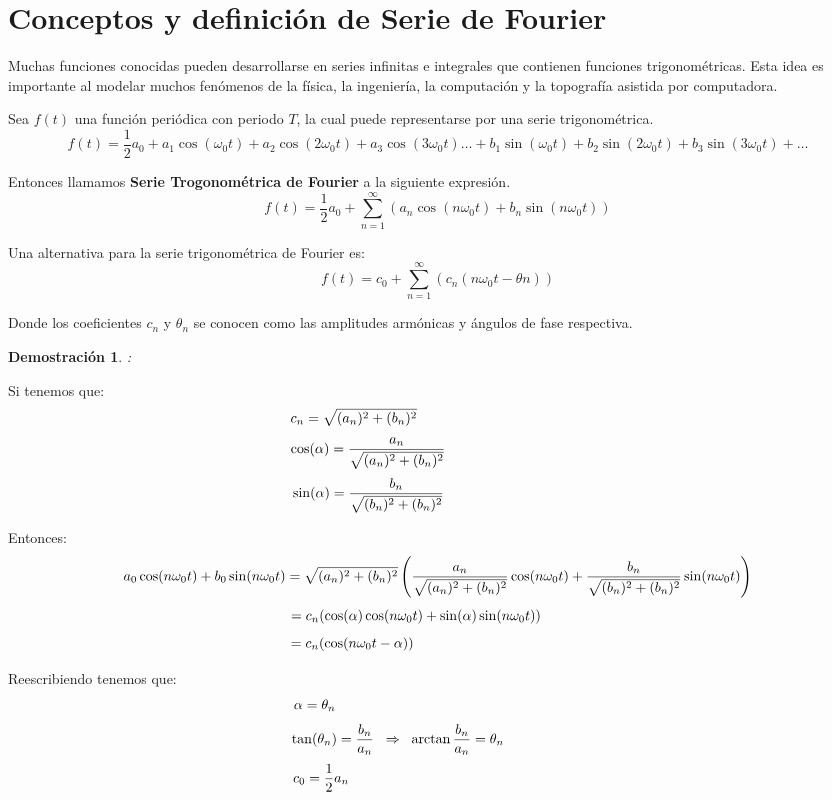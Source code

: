 \documentclass[a4paper]{article}
\newtheorem{dmt}{Demostraci\'on}
\begin{document}
\section{Conceptos y definici\'on de Serie de Fourier}

{} Muchas funciones conocidas pueden desarrollarse en series infinitas e
integrales que contienen funciones trigonom\'etricas. Esta idea es
importante al modelar muchos fen\'omenos de la f\'isica, la ingenier\'ia, la
computaci\'on y la topograf\'ia asistida por computadora. 

{} Sea $f\left(t\right)$ una funci\'on peri\'odica con periodo $T$, la cual
puede representarse por una serie trigonom\'etrica.  
\[
f(t)=\frac{1}{2}a_{0}+a_{1}\cos (\omega_{0}t)+a_{2}\cos
(2\omega_{0}t)+a_{3}\cos (3\omega_{0}t) \ldots +b_{1}\sin
(\omega_{0}t)+b_{2}\sin (2\omega_{0}t)+b_{3}\sin (3\omega_{0}t)+ \ldots
\]

{} Entonces llamamos \textbf{Serie Trogonom\'etrica de Fourier} a la
siguiente expresi\'on.  
\[
f(t)=\frac{1}{2}a_{0}+\sum_{n=1}^{\infty}{\left(a_{n}\cos
(n\omega_{0}t)+b_{n}\sin (n\omega_{0}t)\right)}
\]

{} Una alternativa para la serie trigonom\'etrica de Fourier es:  
\[
f(t)=c_{0}+\sum_{n=1}^{\infty}\left(c_{n}(n\omega_{0}t-\theta n)\right)
\]

{} Donde los coeficientes $c_{n}$ y $\theta_{n}$ se conocen como las
amplitudes arm\'onicas y \'angulos de fase respectiva. 

\begin{dmt}
: 
\end{dmt}

{} Si tenemos que:  
\[
c_{n}=\sqrt{(a_{n})^{2}+(b_{n})^{2}} \hspace{4.2cm}
\]
\[
\cos (\alpha)=\frac{a_{n}}{\sqrt{(a_{n})^{2}+(b_{n})^{2}}} \hspace{3.5cm}
\]
\[
\sin (\alpha)=\frac{b_{n}}{\sqrt{(b_{n})^{2}+(b_{n})^{2}}} \hspace{3.5cm}
\]

{} Entonces:  
\[
a_{0}\cos (n\omega_{0}t)+b_{0}\sin (n\omega_{0}t)= \sqrt{%
(a_{n})^{2}+(b_{n})^{2}} \left(\frac{a_{n}}{\sqrt{(a_{n})^{2}+(b_{n})^{2}}}%
\cos (n\omega_{0}t) + \frac{b_{n}}{\sqrt{(b_{n})^{2}+(b_{n})^{2}}}\sin
(n\omega_{0}t)\right)
\]
\[
=c_{n}(\cos(\alpha)\cos(n\omega_{0}t)+\sin(\alpha)\sin(n\omega_{0}t)) 
\hspace{1.1cm}
\]
\[
=c_{n}(\cos(n\omega_{0}t-\alpha)) \hspace{4.3cm}
\]

{} Reescribiendo tenemos que:  
\[
\alpha=\theta_{n} \hspace{6.2cm}
\]
\[
\tan(\theta_{n})=\frac{b_{n}}{a_{n}} \hspace{0.2cm} \Rightarrow \hspace{0.2cm%
} \arctan \frac{b_{n}}{a_{n}}=\theta_{n} \hspace{2cm}
\]
\[
c_{0}=\frac{1}{2}a_{n} \hspace{5.9cm}
\]
\end{document}
